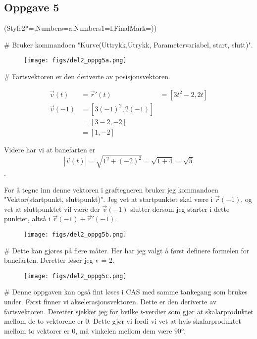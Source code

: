 \subsection*{Oppgave 5}

\begin{easylist}[enumerate]
	\ListProperties(Style2*=,Numbers=a,Numbers1=l,FinalMark={)})
	
	# Bruker kommandoen "Kurve(Uttrykk,Utrykk, Parametervariabel, start, slutt)".
	\begin{figure}[ht!]
		\centering
		\texttt{[image: figs/del2\_oppg5a.png]}
	\end{figure}
	
	# Fartsvektoren er den deriverte av posisjonsvektoren.
	
	\begin{equation*}
		\begin{aligned}
			\vec{v}(t) & = \vec{r}'(t) & = [3t^2 -2, 2t] \\
			\vec{v}(-1) & = [3(-1)^2,2(-1)] \\
			& = [3-2,-2] \\
			& = [1,-2] 
		\end{aligned}
	\end{equation*}
	
	Videre har vi at banefarten er $$|\vec{v}(t)| = \sqrt{1^2 + (-2)^2} = \sqrt{1 + 4} = \sqrt{5}$$.
	
	For å tegne inn denne vektoren i graftegneren bruker jeg kommandoen "Vektor(startpunkt, sluttpunkt)". Jeg vet at startpunktet skal være i $\vec{r}(-1)$, og vet at sluttpunktet vil være der $\vec{v}(-1)$ slutter dersom jeg starter i dette punktet, altså i $\vec{r}(-1) + \vec{r}'(-1)$.

	\begin{figure}[ht!]
		\centering
		\texttt{[image: figs/del2\_oppg5b.png]}
	\end{figure}
	
	\newpage
	# Dette kan gjøres på flere måter. Her har jeg valgt å først definere formelen for banefarten. Deretter løser jeg v = 2. 
		\begin{figure}[ht!]
			\centering
			\texttt{[image: figs/del2\_oppg5c.png]}
		\end{figure}
		
		# Denne oppgaven kan også fint løses i CAS med samme tankegang som brukes under. Først finner vi akselerasjonsvektoren. Dette er den deriverte av fartsvektoren. Deretter sjekker jeg for hvilke $t$-verdier som gjør at skalarproduktet mellom de to vektorene er 0. Dette gjør vi fordi vi vet at hvis skalarproduktet mellom to vektorer er 0, må vinkelen mellom dem være $\ang{90}$. 
		

\end{easylist}

